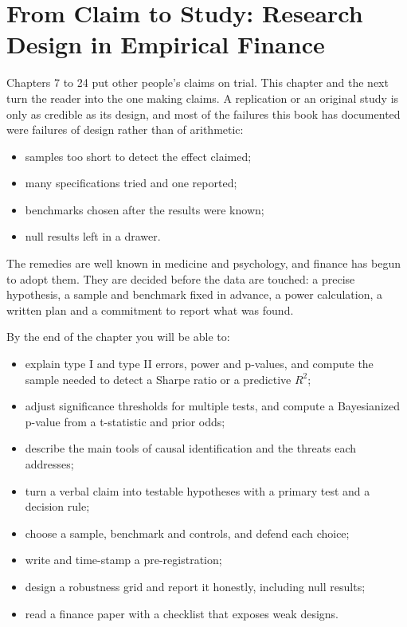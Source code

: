 \makeatletter
{}
\makeatother

\chapter{From Claim to Study: Research Design in Empirical Finance}
\label{ch:25}

Chapters 7 to 24 put other people's claims on trial. This chapter and the next turn the reader into the one making claims. A replication or an original study is only as credible as its design, and most of the failures this book has documented were failures of design rather than of arithmetic:

\begin{itemize}
  \item samples too short to detect the effect claimed;
  \item many specifications tried and one reported;
  \item benchmarks chosen after the results were known;
  \item null results left in a drawer.
\end{itemize}

The remedies are well known in medicine and psychology, and finance has begun to adopt them. They are decided before the data are touched: a precise hypothesis, a sample and benchmark fixed in advance, a power calculation, a written plan and a commitment to report what was found.

By the end of the chapter you will be able to:

\begin{itemize}
  \item explain type I and type II errors, power and p-values, and compute the sample needed to detect a Sharpe ratio or a predictive $R^2$;
  \item adjust significance thresholds for multiple tests, and compute a Bayesianized p-value from a t-statistic and prior odds;
  \item describe the main tools of causal identification and the threats each addresses;
  \item turn a verbal claim into testable hypotheses with a primary test and a decision rule;
  \item choose a sample, benchmark and controls, and defend each choice;
  \item write and time-stamp a pre-registration;
  \item design a robustness grid and report it honestly, including null results;
  \item read a finance paper with a checklist that exposes weak designs.
\end{itemize}

